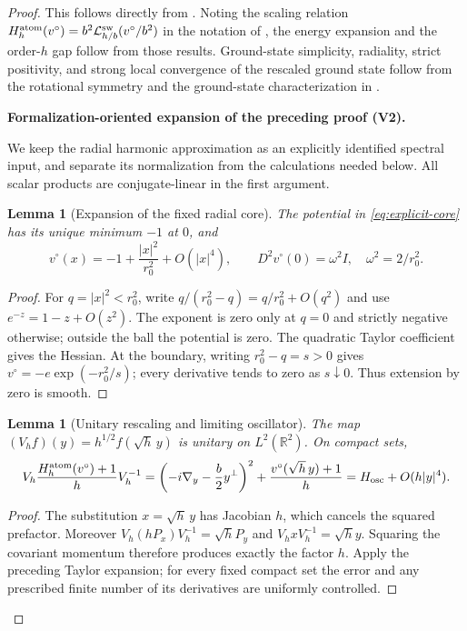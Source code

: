 \documentclass[11pt]{article}
\newtheorem{lemma}[theorem]{Lemma}
\newcommand{\formalisationparentid}{X}
\newenvironment{formalisationaddition}[1]{\par\medskip\begingroup\color{blue}\def\formalisationparentid{#1}\setcounter{formalizationsublemma}{0}\let\lemma\formalizationsublemma\let\endlemma\endformalizationsublemma
  \def\Eo{\mathcal E_h^\circ}\def\EE{\mathcal E_h}\def\phio{\phi_h^\circ}\def\phih{\phi_h}\def\Ho{H_h^{\rm atom}(v^\circ)}\def\Ha{H_h^{\rm atom}}\def\HL{H_h^{L}}\def\Dh{D_h}\def\Log{\operatorname{Log}}\def\ellh{\ell_h}\def\Gp{G_{p,h}}\def\Ast{A_{*,h}}\def\ahat{\widehat{\mathfrak a}_h}\def\ah{\mathfrak a_h}\def\rh{\widehat\rho_h}\def\deltah{\widehat\delta_h}\def\oldref##1{\textup{(##1)}}\def\interface##1{\par\noindent\textit{Analytical interface used here.} ##1\par}\def\finish{\par\noindent\textit{Conclusion of the formalization-oriented expansion.} }\par\noindent\textbf{Formalization-oriented expansion of the preceding proof (V2).}\par\smallskip
}{\par\endgroup\medskip
}
\newcommand{\R}{\mathbb R}
\begin{document}
\begin{proof}
{This follows directly from \cite{HK24}.}
Noting the scaling relation
$H_h^{\rm atom}(v^\circ)=b^2\mathcal L_{h/b}^{\rm sw}(v^\circ/b^2)$ in the notation of
\cite[Theorem~1.1, Proposition~2.1]{HK24}, the energy expansion and the
order-$h$ gap follow from those results.  Ground-state simplicity, radiality,
strict positivity, and strong local convergence of the rescaled ground state follow from the rotational symmetry and the ground-state
characterization in \cite[Proposition~2.1]{HK24}.

\begin{formalisationaddition}{L2.1}
We keep the radial harmonic approximation as an explicitly identified spectral input, and separate its normalization from the calculations needed below. All scalar products are conjugate-linear in the first argument.

\begin{lemma}[Expansion of the fixed radial core]\label{sublemma:L2-1-core-taylor}
The potential in \eqref{eq:explicit-core} has its unique minimum $-1$ at $0$, and
\[
 v^\circ(x)=-1+\frac{|x|^2}{r_0^2}+O(|x|^4),\qquad
 D^2v^\circ(0)=\omega^2 I,\quad \omega^2=2/r_0^2.
\]
\end{lemma}
\begin{proof}
For $q=|x|^2<r_0^2$, write
$q/(r_0^2-q)=q/r_0^2+O(q^2)$ and use $e^{-z}=1-z+O(z^2)$.
The exponent is zero only at $q=0$ and strictly negative otherwise; outside the ball the potential is zero. The quadratic Taylor coefficient gives the Hessian. At the boundary, writing $r_0^2-q=s>0$ gives $v^\circ=-e\exp(-r_0^2/s)$; every derivative tends to zero as $s\downarrow0$. Thus extension by zero is smooth.
\end{proof}

\begin{lemma}[Unitary rescaling and limiting oscillator]\label{sublemma:L2-1-rescale}
The map $(V_hf)(y)=h^{1/2}f(\sqrt h\,y)$ is unitary on $L^2(\R^2)$. On compact sets,
\[
 V_h\frac{\Ho+1}{h}V_h^{-1}
 =\left(-i\nabla_y-\frac b2y^\perp\right)^2+
   \frac{v^\circ(\sqrt h\,y)+1}{h}
 =H_{\rm osc}+O(h|y|^4).
\]
\end{lemma}
\begin{proof}
The substitution $x=\sqrt h\,y$ has Jacobian $h$, which cancels the squared prefactor. Moreover
$V_h(hP_x)V_h^{-1}=\sqrt h P_y$ and
$V_h x V_h^{-1}=\sqrt h y$. Squaring the covariant momentum therefore produces exactly the factor $h$. Apply the preceding Taylor expansion; for every fixed compact set the error and any prescribed finite number of its derivatives are uniformly controlled.
\end{proof}


\end{formalisationaddition}
\end{proof}
\end{document}
